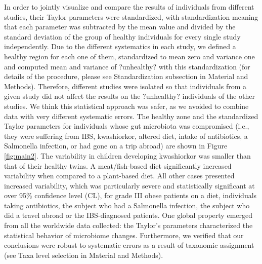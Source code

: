 In order to jointly visualize and compare the results of individuals from different studies\cite{IBS,moving,antibiotic,LEA,kwashiorkor,diet,hostlife}, their Taylor parameters were standardized, with standardization meaning that each parameter was subtracted by the mean value and divided by the standard deviation of the group of healthy individuals for every single study independently. Due to the different systematics in each study, we defined a healthy region for each one of them, standardized to mean zero and variance one and computed mean and variance of ?unhealthy? with this standardization (for details of the procedure, please see Standardization subsection in Material and Methods). Therefore, different studies were isolated so that individuals from a given study did not affect the results on the ?unhealthy? individuals of the other studies. We think this statistical approach was safer, as we avoided to combine data with very different systematic errors. The healthy zone and the standardized Taylor parameters for individuals whose gut microbiota was compromised (i.e., they were suffering from IBS, kwashiorkor, altered diet, intake of antibiotics, a Salmonella infection, or had gone on a trip abroad) are shown in Figure \ref{fig:main2}. The variability in children developing kwashiorkor was smaller than that of their healthy twins. A meat/fish-based diet significantly increased variability when compared to a plant-based diet. All other cases presented increased variability, which was particularly severe and statistically significant at over 95\% confidence level (CL), for grade III obese patients on a diet, individuals taking antibiotics, the subject who had a Salmonella infection, the subject who did a travel abroad or the IBS-diagnosed patients. One global property emerged from all the worldwide data collected: the Taylor's parameters characterized the statistical behavior of microbiome changes. Furthermore, we verified that our conclusions were robust to systematic errors as a result of taxonomic assignment (see Taxa level selection in Material and Methods).

